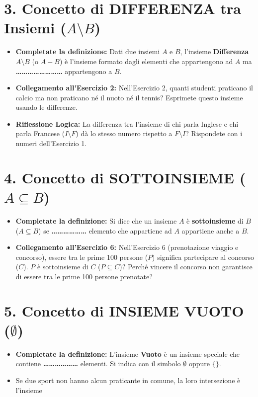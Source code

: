 \documentclass[11pt, a4paper]{article}
\begin{document}
\section*{3. Concetto di DIFFERENZA tra Insiemi ($A \setminus B$)}
\begin{itemize}
    \item \textbf{Completate la definizione:} Dati due insiemi $A$ e $B$, l'insieme \textbf{Differenza} $A \setminus B$ (o $A - B$) è l'insieme formato dagli elementi che appartengono ad $A$ ma \textbf{\dots\dots\dots\dots\dots\dots\dots\dots} appartengono a $B$.
    \item \textbf{Collegamento all'Esercizio 2:} Nell'Esercizio 2, quanti studenti praticano il calcio ma non praticano né il nuoto né il tennis? Esprimete questo insieme usando le differenze.
    \item \textbf{Riflessione Logica:} La differenza tra l'insieme di chi parla Inglese e chi parla Francese ($I \setminus F$) dà lo stesso numero rispetto a $F \setminus I$? Rispondete con i numeri dell'Esercizio 1.
    
    \vspace{0.8cm}
\end{itemize}

\vspace{-1mm}

\section*{4. Concetto di SOTTOINSIEME ($A \subseteq B$)}
\begin{itemize}
    \item \textbf{Completate la definizione:} Si dice che un insieme $A$ è \textbf{sottoinsieme} di $B$ ($A \subseteq B$) se \textbf{\dots\dots\dots\dots\dots\dots} elemento che appartiene ad $A$ appartiene anche a $B$.
    \item \textbf{Collegamento all'Esercizio 6:} Nell'Esercizio 6 (prenotazione viaggio e concorso), essere tra le prime 100 persone ($P$) significa partecipare al concorso ($C$). $P$ è sottoinsieme di $C$ ($P \subseteq C$)? Perché vincere il concorso non garantisce di essere tra le prime 100 persone prenotate?
    
    \vspace{0.8cm}
\end{itemize}

\vspace{-1mm}

\section*{5. Concetto di INSIEME VUOTO ($\emptyset$)}
\begin{itemize}
    \item \textbf{Completate la definizione:} L'insieme \textbf{Vuoto} è un insieme speciale che contiene \textbf{\dots\dots\dots\dots\dots\dots} elementi. Si indica con il simbolo $\emptyset$ oppure $\{ \}$.
    \item Se due sport non hanno alcun praticante in comune, la loro intersezione è l'insieme \dotfill
\end{itemize}
\end{document}
